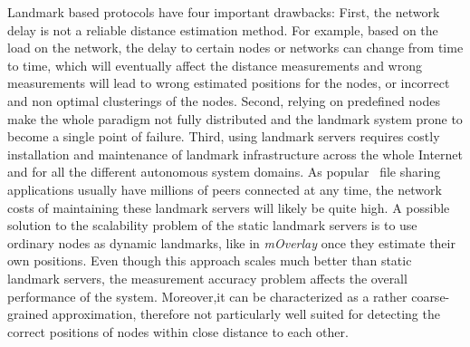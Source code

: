 Landmark based protocols have four important drawbacks: First, the network
delay is not a reliable distance estimation method. For example, based on the
load on the network, the delay to certain nodes or networks can change from time
to time, which will eventually affect the distance measurements and wrong
measurements will lead to wrong estimated positions for the nodes, or incorrect
and non optimal clusterings of the nodes. Second, relying on predefined nodes
make the whole paradigm not fully distributed and the landmark system prone to
become a single point of failure. Third, using
landmark servers requires costly installation and maintenance of landmark
infrastructure across the whole Internet and for all the different autonomous
system domains. 
As popular \p\ file sharing applications usually have millions
of peers connected at any time, the network costs
of maintaining these landmark servers will likely be quite high. 
A possible solution to
the scalability problem of the static landmark servers is to use ordinary nodes
as dynamic landmarks, like in \emph{mOverlay} once they estimate their own positions. Even though this
approach scales much better than static landmark servers, the measurement
accuracy problem affects the overall performance of the system. Moreover,it can
be characterized as a rather coarse-grained approximation, therefore not
particularly well suited for detecting the correct positions of nodes within
close distance to each other.




